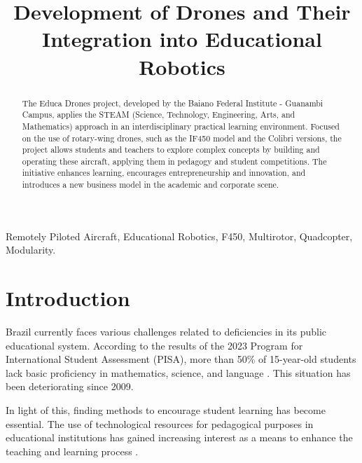 \documentclass[conference]{IEEEtran}
\begin{document}
\title{Development of Drones and Their Integration into Educational Robotics}


\maketitle

\begin{abstract}
The Educa Drones project, developed by the Baiano Federal Institute - Guanambi Campus, applies the STEAM (Science, Technology, Engineering, Arts, and Mathematics) approach in an interdisciplinary practical learning environment. Focused on the use of rotary-wing drones, such as the IF450 model and the Colibri versions, the project allows students and teachers to explore complex concepts by building and operating these aircraft, applying them in pedagogy and student competitions. The initiative enhances learning, encourages entrepreneurship and innovation, and introduces a new business model in the academic and corporate scene.
\end{abstract}

\begin{IEEEkeywords}
Remotely Piloted Aircraft, Educational Robotics, F450, Multirotor, Quadcopter, Modularity.
\end{IEEEkeywords}

\section{Introduction}

Brazil currently faces various challenges related to deficiencies in its public educational system. According to the results of the 2023 Program for International Student Assessment (PISA), more than 50\% of 15-year-old students lack basic proficiency in mathematics, science, and language \cite{b6}. This situation has been deteriorating since 2009.

In light of this, finding methods to encourage student learning has become essential. The use of technological resources for pedagogical purposes in educational institutions has gained increasing interest as a means to enhance the teaching and learning process \cite{b12}.
\end{document}
